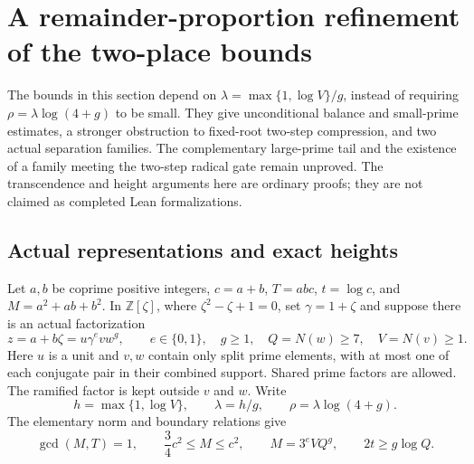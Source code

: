 \section{A remainder-proportion refinement of the two-place bounds}
\label{lr-section}

The bounds in this section depend on
$\lambda=\max\{1,\log V\}/g$, instead of requiring
$\rho=\lambda\log(4+g)$ to be small. They give unconditional balance and
small-prime estimates, a stronger obstruction to fixed-root two-step
compression, and two actual separation families. The complementary large-prime
tail and the existence of a family meeting the two-step radical gate remain
unproved. The transcendence and height arguments here are ordinary proofs;
they are not claimed as completed Lean formalizations.

\subsection{Actual representations and exact heights}
Let $a,b$ be coprime positive integers, $c=a+b$, $T=abc$, $t=\log c$, and
$M=a^2+ab+b^2$. In $\mathbb Z[\zeta]$, where $\zeta^2-\zeta+1=0$, set
$\gamma=1+\zeta$ and suppose there is an actual factorization
\begin{equation}\label{lr-profile}
 z=a+b\zeta=u\gamma^e v w^g,\qquad
 e\in\{0,1\},\quad g\ge1,\quad Q=N(w)\ge7,\quad V=N(v)\ge1.
\end{equation}
Here $u$ is a unit and $v,w$ contain only split prime elements, with at most
one of each conjugate pair in their combined support. Shared prime factors
are allowed. The ramified factor is kept outside $v$ and $w$. Write
\[
 h=\max\{1,\log V\},\qquad \lambda=h/g,\qquad
 \rho=\lambda\log(4+g).
\]
The elementary norm and boundary relations give
\begin{equation}\label{lr-norm}
 \gcd(M,T)=1,\qquad \frac34c^2\le M\le c^2,\qquad
 M=3^eVQ^g,\qquad 2t\ge g\log Q.
\end{equation}

